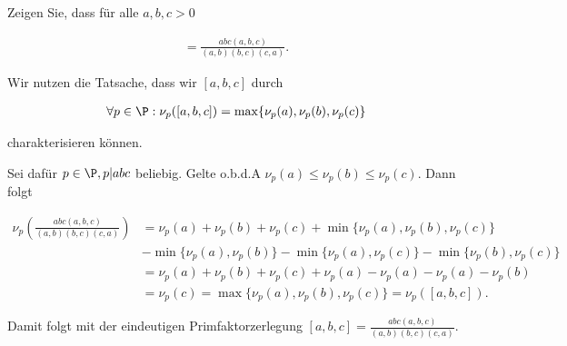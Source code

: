 
\begin{exercise}

Zeigen Sie, dass für alle $a,b,c > 0$

\begin{align*}
    [a,b,c] = \frac{abc(a,b,c)}{(a,b)(b,c)(c,a)}.
\end{align*}

\end{exercise}


\begin{solution}

Wir nutzen die Tatsache, dass wir $[a,b,c]$ durch

\begin{align*}
    \forall p \in \P: \nu_p([a,b,c]) = \max\{ \nu_p(a), \nu_p(b), \nu_p(c)\}
\end{align*}

charakterisieren können.

Sei dafür $p \in \P, p | abc$ beliebig. Gelte o.b.d.A $\nu_p(a) \leq \nu_p(b) \leq \nu_p(c)$.
Dann folgt

\begin{align*}
    \nu_p\left(\frac{abc(a,b,c)}{(a,b)(b,c)(c,a)}\right)
    &= \nu_p(a) + \nu_p(b) + \nu_p(c) + \min\{\nu_p(a), \nu_p(b), \nu_p(c)\} \\
    &- \min\{\nu_p(a), \nu_p(b)\} - \min\{\nu_p(a), \nu_p(c)\}
    - \min\{\nu_p(b), \nu_p(c)\} \\
    &= \nu_p(a) + \nu_p(b) + \nu_p(c) + \nu_p(a) - \nu_p(a) - \nu_p(a) - \nu_p(b) \\
    &= \nu_p(c) = \max\{\nu_p(a), \nu_p(b), \nu_p(c)\} = \nu_p([a,b,c]).
\end{align*}

Damit folgt mit der eindeutigen Primfaktorzerlegung $[a,b,c] = \frac{abc(a,b,c)}{(a,b)(b,c)(c,a)}$.

\end{solution}

